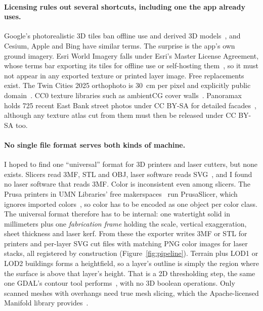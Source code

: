 \documentclass[11pt,letterpaper]{article}
\begin{document}
\paragraph{Licensing rules out several shortcuts, including one the app already uses.} Google's photorealistic 3D tiles ban offline use and derived 3D models~\cite{googletiles}, and Cesium, Apple and Bing have similar terms. The surprise is the app's own ground imagery. Esri World Imagery falls under Esri's Master License Agreement, whose terms bar exporting its tiles for offline use or self-hosting them~\cite{esriimagery,esritou}, so it must not appear in any exported texture or printed layer image. Free replacements exist. The Twin Cities 2025 orthophoto is 30~cm per pixel and explicitly public domain~\cite{metro2025}. CC0 texture libraries such as ambientCG cover walls~\cite{ambientcg}. Panoramax holds 725 recent East Bank street photos under CC BY-SA for detailed facades~\cite{panoramax}, although any texture atlas cut from them must then be released under CC BY-SA too.

\paragraph{No single file format serves both kinds of machine.} I hoped to find one ``universal'' format for 3D printers and laser cutters, but none exists. Slicers read 3MF, STL and OBJ, laser software reads SVG~\cite{visicut}, and I found no laser software that reads 3MF. Color is inconsistent even among slicers. The Prusa printers in UMN Libraries' free makerspaces~\cite{umnmakerspaces} run PrusaSlicer, which ignores imported colors~\cite{prusacolor}, so color has to be encoded as one object per color class. The universal format therefore has to be internal: one watertight solid in millimeters plus one \emph{fabrication frame} holding the scale, vertical exaggeration, sheet thickness and laser kerf. From these the exporter writes 3MF or STL for printers and per-layer SVG cut files with matching PNG color images for laser stacks, all registered by construction (Figure~\ref{fig:pipeline}). Terrain plus LOD1 or LOD2 buildings forms a heightfield, so a layer's outline is simply the region where the surface is above that layer's height. That is a 2D thresholding step, the same one GDAL's contour tool performs~\cite{gdalcontour}, with no 3D boolean operations. Only scanned meshes with overhangs need true mesh slicing, which the Apache-licensed Manifold library provides~\cite{manifold}.
\end{document}
